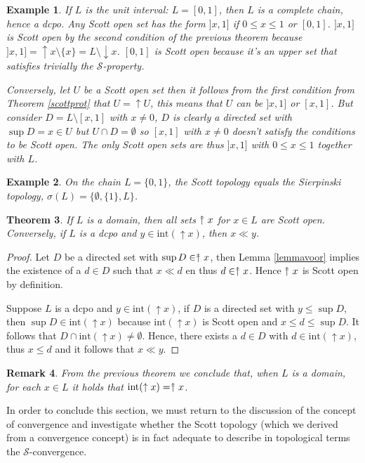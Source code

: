 \documentclass[a4paper,12pt]{article}
\newcommand{\upuparrow}{\mathrel{\reflectbox{\rotatebox[origin=c]{90}{$\twoheadrightarrow$}}}}
\newtheorem{theorem}{Theorem}[section]
\newtheorem{example}[theorem]{Example}
\newtheorem{remark}[theorem]{Remark}
\renewcommand{\int}{\text{int}}
\begin{document}
\begin{example}\label{unitkut}
If $L$ is the unit interval: $L = [0,1]$, then $L$ is a complete chain, hence a dcpo.  Any Scott open set has the form $]x,1]$ if $0 \leq x \leq 1$ or $[0, 1]$. $]x, 1]$ is Scott open by the second condition of the previous theorem because $]x, 1] = \uparrow x \setminus \{x\} = L \setminus \downarrow x$. $[0,1]$ is Scott open because it's an upper set that satisfies trivially the $\mathcal{S}$-property.

Conversely, let $U$ be a Scott open set then it follows from the first condition from Theorem \ref{scottprot} that $U = \uparrow U$, this means that $U$ can be $]x, 1]$ or $[x, 1]$. But consider $D = L \setminus [x, 1]$ with $x \neq 0$, $D$ is clearly a directed set with $\sup D = x \in U$ but $U \cap D = \emptyset$ so $[x, 1]$ with $x \neq 0$ doesn't satisfy the conditions to be Scott open. The only Scott open sets are thus $]x, 1]$ with $0 \leq x \leq 1$ together with $L$.
\end{example}


\begin{example}
On the chain $L = \{0, 1\}$, the Scott topology equals the Sierpinski topology, $\sigma(L) = \{\emptyset, \{1\}, L\}$.
\end{example}

\begin{theorem}\label{begindomein}
If $L$ is a domain, then all sets $\upuparrow x$ for $x \in L$ are Scott open. Conversely, if $L$ is a dcpo and $y \in \int(\uparrow x)$, then $x \ll y$.
\end{theorem}

\begin{proof}
Let $D$ be a directed set with $\sup D \in \upuparrow x$, then Lemma \ref{lemmavoor} implies the existence of a $d \in D$ such that $x \ll d$ en thus $d \in \upuparrow x$. Hence $\upuparrow x$ is Scott open by definition.

Suppose $L$ is a dcpo and $y \in \int(\uparrow x)$, if $D$ is a directed set with $y \leq \sup D$, then $\sup D \in \int(\uparrow x)$ because $\int(\uparrow x)$ is Scott open and $x \leq d \leq \sup D$. It follows that $D \cap \int(\uparrow x) \neq \emptyset$. Hence, there exists a $d \in D$ with $d \in \int(\uparrow x)$, thus $x \leq d$ and it follows that $x \ll y$.
\end{proof}
\begin{remark}
From the previous theorem we conclude that, when $L$ is a domain, for each $x \in L$ it holds that $\int(\uparrow x) = \upuparrow x$.
\end{remark}
In order to conclude this section, we must return to the discussion of the concept of convergence and investigate whether the Scott topology (which we derived from a convergence concept) is in fact adequate to describe in topological terms the $\mathcal{S}$-convergence.
\end{document}

